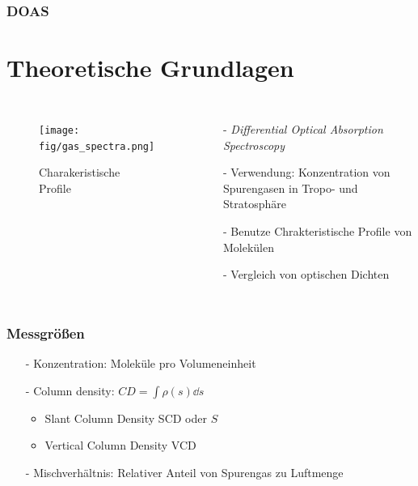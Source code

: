 \documentclass{beamer}
\begin{document}
\begin{frame}
    \frametitle{DOAS}
    \section{Theoretische Grundlagen}
    \begin{columns}

        \begin{figure}
        \texttt{[image: fig/gas\_spectra.png]}
        \caption{Charakeristische Profile}
        \end{figure}
    
    \begin{itemize}
        \item[-] \textit{Differential Optical Absorption Spectroscopy}
            \pause
        \item[-] Verwendung: Konzentration von Spurengasen in Tropo- und Stratosphäre
            \pause
        \item[-] Benutze Chrakteristische Profile von Molekülen
            \pause
        \item[-] Vergleich von optischen Dichten
    \end{itemize}
\end{columns}
\end{frame}

\begin{frame}
\frametitle{Messgrößen}
\begin{itemize}
    \item[-] Konzentration: Moleküle pro Volumeneinheit
        \pause
    \item[-] Column density: $CD = \int \rho (s) \dd s$
        \begin{itemize}
            \item Slant Column Density SCD oder $S$
            \item Vertical Column Density VCD
        \end{itemize}
        \pause
    \item[-] Mischverhältnis: Relativer Anteil von Spurengas zu Luftmenge
    \end{itemize}
\end{frame}
\end{document}
